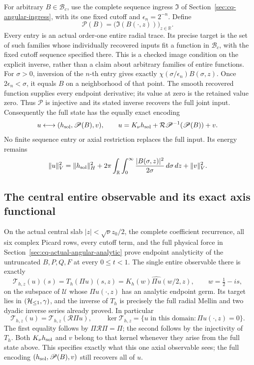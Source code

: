 For arbitrary \(B\in\mathscr B_c\), use the complete sequence ingress
\(\mathfrak I\) of Section~\ref{sec:cq-angular-ingress}, with its one
fixed cutoff and \(\epsilon_n=2^{-n}\). Define
\[
 \mathscr P(B)=\bigl(\mathfrak I(B(\cdot,z))\bigr)_{z\in\mathbb R}.
\]
Every entry is an actual order-one entire radial trace. Its precise
target is the set of such families whose individually recovered inputs
fit a function in \(\mathscr B_c\), with the fixed cutoff sequence
specified there. This is a checked image condition on the explicit
inverse, rather than a claim about arbitrary families of entire functions.
For \(\sigma>0\), inversion of the \(n\)-th entry gives exactly
\(\chi(\sigma/\epsilon_n)B(\sigma,z)\). Once
\(2\epsilon_n<\sigma\), it equals \(B\) on a neighborhood of that
point. The smooth recovered function supplies every endpoint derivative;
its value at zero is the retained value zero. Thus \(\mathscr P\) is
injective and its stated inverse recovers the full joint input.
Consequently the full state has the equally exact encoding
\[
 u\longleftrightarrow(h_{\rm sol},\mathscr P(B),v),
 \qquad
 u=K_\nu h_{\rm sol}+\mathcal R\mathscr P^{-1}(\mathscr P(B))+v.
\]
No finite sequence entry or axial restriction replaces the full input.
Its energy remains
\[
 \|u\|_V^2=\|h_{\rm sol}\|_H^2+
 2\pi\int_{\mathbb R}\int_0^\infty
                \frac{|B(\sigma,z)|^2}{2\sigma}\,d\sigma\,dz
 +\|v\|_V^2.
\]

\subsection*{The central entire observable and its exact axis functional}

On the actual central slab \(|z|<\sqrt\nu z_0/2\), the complete
coefficient recurrence, all six complex Picard rows, every cutoff term,
and the full physical force in
Section~\ref{sec:cq-actual-angular-analytic} prove endpoint analyticity
of the untruncated \(B,P,Q,F\) at every \(0\leq t<1\).
The single entire observable there is exactly
\[
 \mathcal T_{h,z}(u)(s)=T_h(\Pi u)(s,z)
 =K_h(w)\widehat{\Pi u}(w/2,z),\qquad w=\tfrac12-is,
\]
on the subspace of \(\mathscr U\) whose \(\Pi u(\cdot,z)\) has an
analytic endpoint germ. Its target lies in \((\mathcal H_{\leq 1},\gamma)\), and
the inverse of \(T_h\) is precisely the full radial Mellin and two
dyadic inverse series already proved. In particular
\[
 \mathcal T_{h,z}(u)=\mathcal T_{h,z}(\mathcal R\Pi u),
 \qquad
 \ker\mathcal T_{h,z}=
 \{u\text{ in this domain}:\Pi u(\cdot,z)=0\}.
\]
The first equality follows by \(\Pi\mathcal R\Pi=\Pi\); the second
follows by the injectivity of \(T_h\). Both \(K_\nu h_{\rm sol}\)
and \(v\) belong to that kernel whenever they arise from the full
state above. This specifies exactly what this one axial observable sees;
the full encoding \((h_{\rm sol},\mathscr P(B),v)\) still recovers
all of \(u\).

